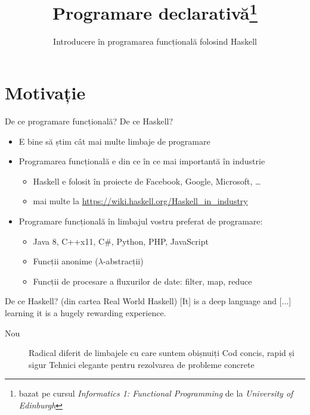\documentclass[xcolor=pdftex,romanian,colorlinks]{beamer}
\title[PD---Introducere]{Programare declarativă\thanks{bazat pe cursul \emph{Informatics 1: Functional Programming} de la \emph{University of Edinburgh}}}
\subtitle{Introducere în programarea funcțională folosind Haskell}
\begin{document}
\begin{frame}
  \titlepage
\end{frame}

\section{Motivație}
\begin{frame}{De ce programare funcțională? De ce Haskell?}
\begin{itemize}
\item E bine să știm cât mai multe limbaje de programare
\item Programarea funcțională e din ce în ce mai importantă în industrie
\begin{itemize}
\item Haskell e folosit în proiecte de Facebook, Google, Microsoft, \ldots
\item mai multe la \url{https://wiki.haskell.org/Haskell_in_industry}
\end{itemize}
\item Programare funcțională în limbajul vostru preferat de programare:

\begin{itemize}
\item  Java 8, C++x11, C\#, Python, PHP, JavaScript
\item Funcții anonime ($\lambda$-abstracții)
\item Funcții de procesare a fluxurilor de date: filter, map, reduce
\end{itemize}
\end{itemize}

\begin{block}{De ce Haskell? (din cartea Real World Haskell)}
 [It] is a deep language and [...] learning it is a hugely rewarding experience.
\end{block}
\begin{description}
\item[Nou] Radical diferit de limbajele cu care suntem obișnuiți
\vitem[Puternic] Cod concis, rapid și sigur
\vitem[Plăcut] Tehnici elegante pentru rezolvarea de probleme concrete
\end{description}
\end{frame}
\end{document}
